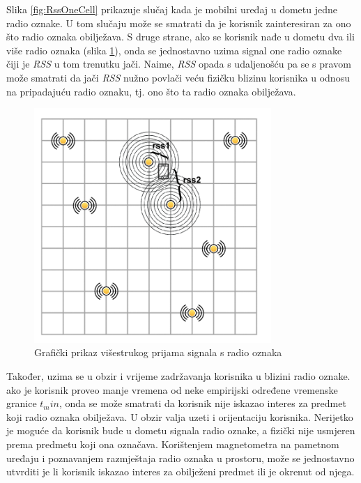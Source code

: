 \documentclass[times, utf8, diplomski, numeric]{fer}
\begin{document}
Slika \ref{fig:RssOneCell} prikazuje slučaj kada je mobilni
uređaj u dometu jedne radio oznake. U tom slučaju može se smatrati da je
korisnik zainteresiran za ono što radio oznaka obilježava. S druge strane,
ako se korisnik nađe u dometu dva ili više radio oznaka (slika
\ref{fig:RssTwoCells}), onda se jednostavno uzima signal one radio oznake čiji
je \emph{RSS} u tom trenutku jači. Naime, \emph{RSS} opada s udaljenošću pa se s
pravom može smatrati da jači \emph{RSS} nužno povlači veću fizičku blizinu
korisnika u odnosu na pripadajuću radio oznaku, tj. ono što ta radio oznaka
obilježava.

\begin{figure}[!htb]
	\centering
	\includegraphics[width=9cm]{images/gridbeacons2cells.png}
	\caption{Grafički prikaz višestrukog prijama signala s radio oznaka}
	\label{fig:RssTwoCells}
\end{figure}

Također, uzima se u obzir i vrijeme zadržavanja korisnika u blizini radio
oznake. ako je korisnik proveo manje vremena od neke empirijski određene
vremenske granice $t_min$, onda se može smatrati da korisnik nije iskazao
interes za predmet koji radio oznaka obilježava.
U obzir valja uzeti i orijentaciju korisnika. Nerijetko je moguće da korisnik
bude u dometu signala radio oznake, a fizički nije usmjeren prema predmetu koji
ona označava. Korištenjem magnetometra na pametnom uređaju i poznavanjem
razmještaja radio oznaka u prostoru, može se jednostavno utvrditi je li korisnik
iskazao interes za obilježeni predmet ili je okrenut od njega.
\end{document}
